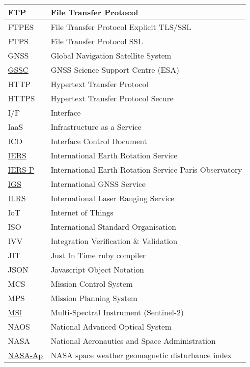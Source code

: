 \documentclass[dec_sum_main.tex]{subfiles}
\begin{document}
\begin{longtable}{|m{2.8cm}|m{10cm}|}
	FTP & File Transfer Protocol \\ \hline
	FTPES & File Transfer Protocol Explicit TLS/SSL \\ \hline
	FTPS & File Transfer Protocol SSL \\ \hline
	GNSS & Global Navigation Satellite System \\ \hline
	\href{https://gssc.esa.int/#about-us}{GSSC} & GNSS Science Support Centre (ESA) \\ \hline
	HTTP & Hypertext Transfer Protocol \\ \hline
	HTTPS & Hypertext Transfer Protocol Secure\\ \hline
	I/F & Interface \\ \hline
	IaaS & Infrastructure as a Service \\ \hline
	ICD & Interface Control Document \\ \hline
	\href{https://www.iers.org/IERS/EN/Publications/Bulletins/bulletins.html}{IERS} & International Earth Rotation Service \\ \hline
	\href{https://hpiers.obspm.fr/}{IERS-P} & International Earth Rotation Service Paris Observatory\\ \hline
	\href{https://igs.org/about/#products}{IGS} & International GNSS Service \\ \hline
	\href{https://ilrs.gsfc.nasa.gov/data_and_products/data_centers/index.html}{ILRS} & International Laser Ranging Service \\ \hline
	IoT & Internet of Things \\ \hline
	ISO & International Standard Organisation \\ \hline
    IVV & Integration Verification \& Validation \\ \hline
    \href{https://www.ruby-lang.org/en/news/2021/12/25/ruby-3-1-0-released/}{JIT} & Just In Time ruby compiler \\ \hline
	JSON & Javascript Object Notation \\ \hline
    MCS & Mission Control System \\ \hline
    MPS & Mission Planning System \\ \hline
	\href{https://sentinels.copernicus.eu/web/sentinel/technical-guides/sentinel-2-msi/msi-instrument}{MSI} & Multi-Spectral Instrument (Sentinel-2) \\ \hline
	NAOS & National Advanced Optical System \\ \hline
    NASA & National Aeronautics and Space Administration \\ \hline
    \href{https://www.nasa.gov/msfcsolar}{NASA-Ap} & NASA space weather geomagnetic disturbance index \\ \hline

\end{longtable}
\end{document}
